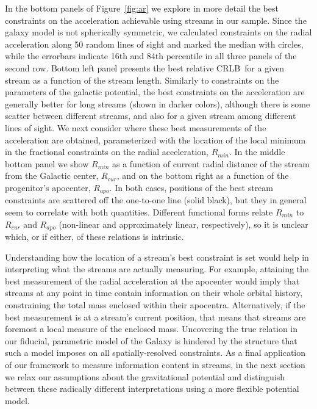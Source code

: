 \documentclass[modern]{aastex61}
\newcommand{\acronym}[1]{{\small{#1}}}
\newcommand{\CRLB}{\acronym{CRLB}}
\begin{document}
In the bottom panels of Figure~\ref{fig:ar} we explore in more detail the best constraints on the acceleration achievable using streams in our sample.
Since the galaxy model is not spherically symmetric, we calculated constraints on the radial acceleration along 50 random lines of sight and marked the median with circles, while the errorbars indicate 16th and 84th percentile in all three panels of the second row.
Bottom left panel presents the best relative \CRLB\ for a given stream as a function of the stream length.
Similarly to constraints on the parameters of the galactic potential, the best constraints on the acceleration are generally better for long streams (shown in darker colors), although there is some scatter between different streams, and also for a given stream among different lines of sight.
We next consider where these best measurements of the acceleration are obtained, parameterized with the location of the local minimum in the fractional constraints on the radial acceleration, $R_{min}$.
In the middle bottom panel we show $R_{min}$ as a function of current radial distance of the stream from the Galactic center, $R_{cur}$, and on the bottom right as a function of the progenitor's apocenter, $R_{apo}$.
In both cases, positions of the best stream constraints are scattered off the one-to-one line (solid black), but they in general seem to correlate with both quantities.
Different functional forms relate $R_{min}$ to $R_{cur}$ and $R_{apo}$ (non-linear and approximately linear, respectively), so it is unclear which, or if either, of these relations is intrinsic.

Understanding how the location of a stream's best constraint is set would help in interpreting what the streams are actually measuring.
For example, attaining the best measurement of the radial acceleration at the apocenter would imply that streams at any point in time contain information on their whole orbital history, constraining the total mass enclosed within their apocentra.
Alternatively, if the best measurement is at a stream's current position, that means that streams are foremost a local measure of the enclosed mass.
Uncovering the true relation in our fiducial, parametric model of the Galaxy is hindered by the structure that such a model imposes on all spatially-resolved constraints.
As a final application of our framework to measure information content in streams, in the next section we relax our assumptions about the gravitational potential and distinguish between these radically different interpretations using a more flexible potential model.
\end{document}
